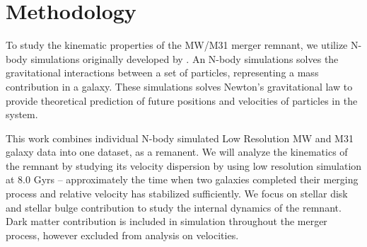 \documentclass[twocolumn, trackchanges]{aastex7}
\begin{document}

\section{Methodology}


To study the kinematic properties of the MW/M31 merger remnant, we utilize N-body simulations originally developed by \citep{van_der_Marel_2012}. An N-body simulations solves the gravitational interactions between a set of particles, representing a mass contribution in a galaxy. These simulations solves Newton's gravitational law to provide theoretical prediction of future positions and velocities of particles in the system. 




This work combines individual N-body simulated Low Resolution MW and M31 galaxy data into one dataset, as a remanent. We will analyze the kinematics of the remnant by studying its velocity dispersion by using low resolution simulation at 8.0 Gyrs -- approximately the time when two galaxies completed their merging process and relative velocity has stabilized sufficiently. We focus on stellar disk and stellar bulge contribution to study the internal dynamics of the remnant. Dark matter contribution is included in simulation throughout the merger process, however excluded from analysis on velocities. 

\end{document}

